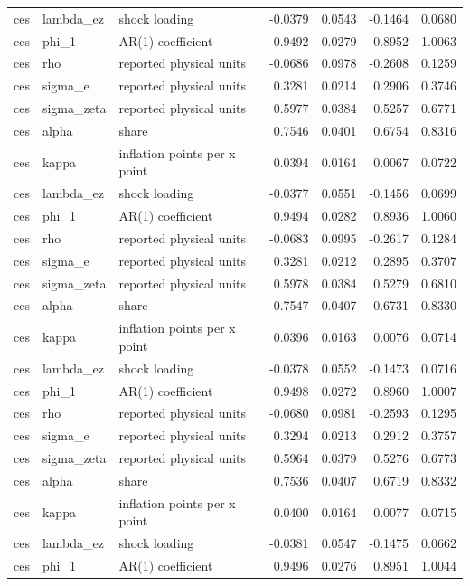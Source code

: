 \begin{tabular}{lllrrrr}
ces & lambda\_ez & shock loading & -0.0379 & 0.0543 & -0.1464 & 0.0680 \\
ces & phi\_1 & AR(1) coefficient & 0.9492 & 0.0279 & 0.8952 & 1.0063 \\
ces & rho & reported physical units & -0.0686 & 0.0978 & -0.2608 & 0.1259 \\
ces & sigma\_e & reported physical units & 0.3281 & 0.0214 & 0.2906 & 0.3746 \\
ces & sigma\_zeta & reported physical units & 0.5977 & 0.0384 & 0.5257 & 0.6771 \\
ces & alpha & share & 0.7546 & 0.0401 & 0.6754 & 0.8316 \\
ces & kappa & inflation points per x point & 0.0394 & 0.0164 & 0.0067 & 0.0722 \\
ces & lambda\_ez & shock loading & -0.0377 & 0.0551 & -0.1456 & 0.0699 \\
ces & phi\_1 & AR(1) coefficient & 0.9494 & 0.0282 & 0.8936 & 1.0060 \\
ces & rho & reported physical units & -0.0683 & 0.0995 & -0.2617 & 0.1284 \\
ces & sigma\_e & reported physical units & 0.3281 & 0.0212 & 0.2895 & 0.3707 \\
ces & sigma\_zeta & reported physical units & 0.5978 & 0.0384 & 0.5279 & 0.6810 \\
ces & alpha & share & 0.7547 & 0.0407 & 0.6731 & 0.8330 \\
ces & kappa & inflation points per x point & 0.0396 & 0.0163 & 0.0076 & 0.0714 \\
ces & lambda\_ez & shock loading & -0.0378 & 0.0552 & -0.1473 & 0.0716 \\
ces & phi\_1 & AR(1) coefficient & 0.9498 & 0.0272 & 0.8960 & 1.0007 \\
ces & rho & reported physical units & -0.0680 & 0.0981 & -0.2593 & 0.1295 \\
ces & sigma\_e & reported physical units & 0.3294 & 0.0213 & 0.2912 & 0.3757 \\
ces & sigma\_zeta & reported physical units & 0.5964 & 0.0379 & 0.5276 & 0.6773 \\
ces & alpha & share & 0.7536 & 0.0407 & 0.6719 & 0.8332 \\
ces & kappa & inflation points per x point & 0.0400 & 0.0164 & 0.0077 & 0.0715 \\
ces & lambda\_ez & shock loading & -0.0381 & 0.0547 & -0.1475 & 0.0662 \\
ces & phi\_1 & AR(1) coefficient & 0.9496 & 0.0276 & 0.8951 & 1.0044 \\

\end{tabular}
